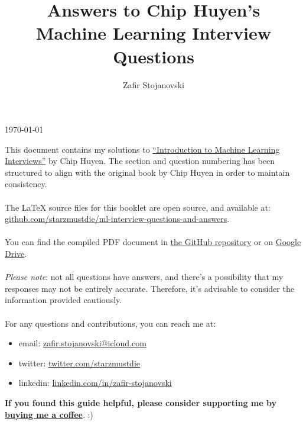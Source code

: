 \documentclass{article}
\title{\Huge Answers to Chip Huyen's \\ Machine Learning Interview Questions}
\author{\Large Zafir Stojanovski}
\date{}
\begin{document}
\maketitle

\thispagestyle{empty} %

\vfill %
\begin{center}
\today
\end{center}

\newpage
\tableofcontents

\setcounter{section}{4}
\newpage

\noindent This document contains my solutions to \href{https://huyenchip.com/ml-interviews-book/}{``Introduction to Machine Learning Interviews''} by Chip Huyen. The section and question numbering has been structured to align with the original book by Chip Huyen in order to maintain consistency.
\\
\\
The \LaTeX \hspace{0.07em} source files for this booklet are open source, and available at: \\ \href{https://github.com/starzmustdie/ml-interview-questions-and-answers}{github.com/starzmustdie/ml-interview-questions-and-answers}. 
\\
\\
You can find the compiled PDF document in \href{https://github.com/starzmustdie/ml-interview-questions-and-answers/blob/main/ML_interview_questions_and_answers.pdf}{the GitHub repository} or on \href{https://drive.google.com/file/d/1P4w12EvvFG19f4uVsvai6fC93p7kRphE/view}{Google Drive}.
\\
\\
\textit{Please note}: not all questions have answers, and there's a possibility that my responses may not be entirely accurate. Therefore, it's advisable to consider the information provided cautiously.
\\
\\
For any questions and contributions, you can reach me at:
\begin{itemize}
    \item email: \href{mailto:zafir.stojanovski@icloud.com}{zafir.stojanovski@icloud.com}
    \item twitter: \href{https://twitter.com/starzmustdie}{twitter.com/starzmustdie}
    \item linkedin: \href{https://www.linkedin.com/in/zafir-stojanovski/}{linkedin.com/in/zafir-stojanovski}
\end{itemize}
\vspace{2em}
\noindent \textbf{If you found this guide helpful, please consider supporting me by \href{https://www.buymeacoffee.com/starzmustdie}{buying me a coffee}}. :) 
\end{document}

